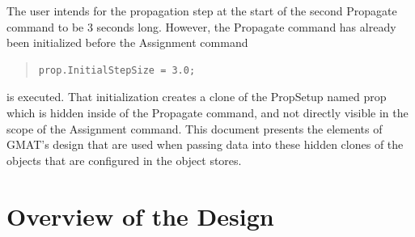 \documentclass[10pt,letterpaper]{article}
\begin{document}
\noindent The user intends for the propagation step at the start of the second Propagate command to be 3 seconds long.  However, the Propagate command has already been initialized before the Assignment command 
\begin{quote}
\begin{verbatim}
prop.InitialStepSize = 3.0;
\end{verbatim}
\end{quote}
\noindent is executed.  That initialization creates a clone of the PropSetup named prop which is hidden inside of the Propagate command, and not directly visible in the scope of the Assignment command.  This document presents the elements of GMAT's design that are used when passing data into these hidden clones of the objects that are configured in the object stores.

\section{Overview of the Design}
\end{document}
